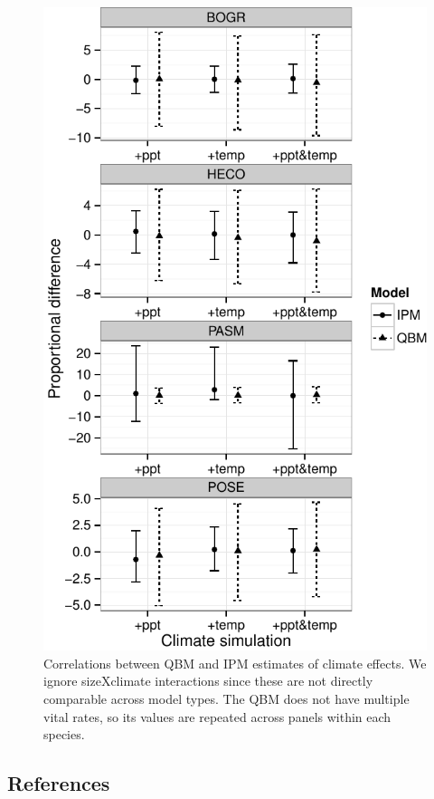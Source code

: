 \documentclass[12pt,]{article}
\begin{document}
\begin{figure}[htbp]
\centering
\includegraphics{components/figure/manuscript-figure_6.pdf}
\caption{Correlations between QBM and IPM estimates of climate effects.
We ignore sizeXclimate interactions since these are not directly
comparable across model types. The QBM does not have multiple vital
rates, so its values are repeated across panels within each species.}
\end{figure}

\pagebreak{}

\subsection{References}\label{references}
\end{document}
